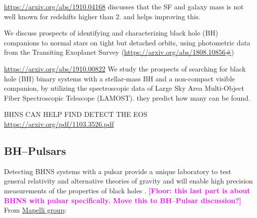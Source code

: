 \documentclass[twocolumn]{aastex63}
\newcommand{\floor}[1]{\textbf{\textcolor{magenta}{[Floor: #1]}}}
\newcommand\bhnsSingle{BHNS\xspace}
\begin{document}
\url{https://arxiv.org/abs/1910.04168} discusses that the SF and galaxy mass is not well known for redshifts higher than 2. and helps improving this. 


We discuss prospects of identifying and characterizing black hole (BH) companions to normal stars on tight but detached orbits, using photometric data from the Transiting Exoplanet Survey (\url{https://arxiv.org/abs/1808.10856#})

\url{https://arxiv.org/abs/1910.00822}
We study the prospects of searching for black hole (BH) binary systems with a stellar-mass \ac{BH} and a non-compact visible companion, by utilizing the spectroscopic data of Large Sky Area Multi-Object Fiber Spectroscopic Telescope (LAMOST). they predict how many can be found. 


BHNS CAN HELP FIND DETECT THE EOS  \url{https://arxiv.org/pdf/1103.3526.pdf}


\subsection{BH--Pulsars}

Detecting  \bhnsSingle systems with a pulsar provide a unique laboratory to test general relativity and alternative theories of gravity \citep{Wex:1998wt,KRAMER2004993} and will enable high precision  measurements of the  properties of black holes    \citep{1975ApJ...198L..27B,1975SvAL....1....2B}.  \floor{this last part is about BHNS with pulsar specifically. Move this to BH--Pulsar discussion?}
%
%
From \href{https://arxiv.org/abs/2003.02277}{Mapelli group}: 
%
\end{document}
